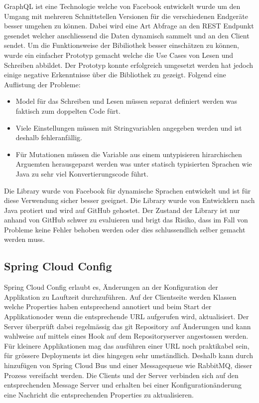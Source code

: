 GraphQL ist eine Technologie welche von Facebook entwickelt wurde um den Umgang mit mehreren Schnittstellen Versionen für die verschiedenen Endgeräte besser umgehen zu können. Dabei wird eine Art Abfrage an den \gls{REST} Endpunkt gesendet welcher anschliessend die Daten dynamisch sammelt und an den Client sendet. Um die Funktionsweise der Bibiliothek besser einschätzen zu können, wurde ein einfacher Prototyp gemacht welche die Use Cases von Lesen und Schreiben abbildet.\newline
Der Prototyp konnte erfolgreich umgesetzt werden hat jedoch einige negative Erkenntnisse über die Bibliothek zu gezeigt. Folgend eine Auflistung der Probleme:\newline
\newline
\begin{itemize}
	\item Model für das Schreiben und Lesen müssen separat definiert werden was faktisch zum doppelten Code fürt.
	\item Viele Einstellungen müssen mit Stringvariablen angegeben werden und ist deshalb fehleranfällig.
	\item Für Mutationen müssen die Variable aus einem untypisieren hirarchischen Arguemten herausgeparst werden was unter statisch typisierten Sprachen wie Java zu sehr viel Konvertierungscode führt.
\end{itemize}
Die Library wurde von Facebook für dynamische Sprachen entwickelt und ist für diese Verwendung sicher besser geeignet. Die Library wurde von Entwicklern nach Java protiert und wird auf GitHub gehostet. Der Zustand der Library ist nur anhand von GitHub schwer zu evaluieren und brigt das Risiko, dass im Fall von Probleme keine Fehler behoben werden oder dies schlussendlich selber gemacht werden muss.

\subsection{Spring Cloud Config}

Spring Cloud Config erlaubt es, Änderungen an der Konfiguration der Applikation zu Lauftzeit durchzuführen. Auf der Clientseite werden Klassen welche Properties haben entsprechend annotiert und beim Start der Applikationoder wenn die entsprechende URL aufgerufen wird, aktualisiert. Der Server überprüft dabei regelmässig das git Repository auf Änderungen und kann wahlweise auf mittels eines Hook auf dem Repositoryserver angestossen werden. Für kleinere Applikationen mag das ausführen einer URL noch praktikabel sein, für grössere Deployments ist dies hingegen sehr umständlich. Deshalb kann durch hinzufügen von Spring Cloud Bus und einer Messagequeue wie RabbitMQ, dieser Prozess vereifacht werden. Die Clients und der Server verbinden sich auf den entsprechenden Message Server und erhalten bei einer Konfigurationänderung eine Nachricht die entsprechenden Properties zu aktualisieren.

